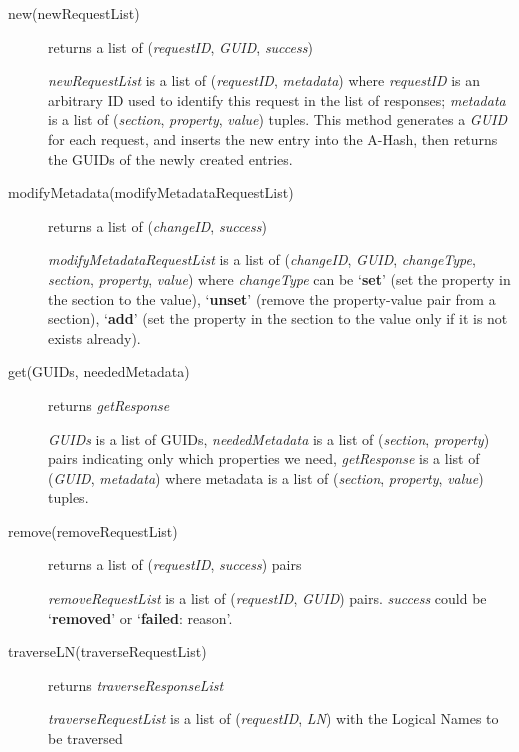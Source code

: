 \documentclass{book}
\begin{document}
 \begin{description}
    \item[new(newRequestList)] returns a list of (\emph{requestID}, \emph{GUID}, \emph{success})
    
    \emph{newRequestList} is a list of (\emph{requestID}, \emph{metadata}) where \emph{requestID} is an arbitrary ID used to identify this request in the list of responses; \emph{metadata} is a list of (\emph{section}, \emph{property}, \emph{value}) tuples.
    This method generates a \emph{GUID} for each request, and inserts the new entry into the A-Hash, then returns the GUIDs of the newly created entries.
    
    \item[modifyMetadata(modifyMetadataRequestList)] returns a list of (\emph{changeID}, \emph{success})

    \emph{modifyMetadataRequestList} is a list of (\emph{changeID}, \emph{GUID}, \emph{changeType}, \emph{section}, \emph{property}, \emph{value}) where \emph{changeType} can be `\textbf{set}’ (set the property in the section to the value), `\textbf{unset}’ (remove the property-value pair from a section), `\textbf{add}’ (set the property in the section to the value only if it is not exists already).
    
    \item [get(GUIDs, neededMetadata)] returns \emph{getResponse}
    
    \emph{GUIDs} is a list of GUIDs, \emph{neededMetadata} is a list of (\emph{section}, \emph{property}) pairs indicating only which properties we need, \emph{getResponse} is a list of (\emph{GUID}, \emph{metadata}) where metadata is a list of (\emph{section}, \emph{property}, \emph{value}) tuples.
    
    \item [remove(removeRequestList)] returns a list of (\emph{requestID}, \emph{success}) pairs
    
    \emph{removeRequestList} is a list of (\emph{requestID}, \emph{GUID}) pairs. \emph{success} could be `\textbf{removed}' or `\textbf{failed}: reason'.
    
    \item [traverseLN(traverseRequestList)] returns \emph{traverseResponseList}
    
    \emph{traverseRequestList} is a list of (\emph{requestID}, \emph{LN}) with the Logical Names to be traversed
    

\end{description}
\end{document}
